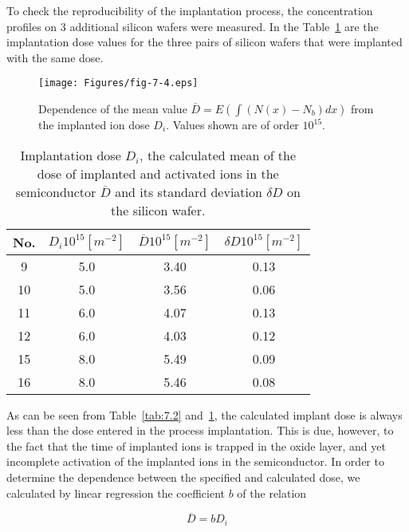 To check the reproducibility of the implantation process, the
concentration profiles on 3 additional silicon wafers were
measured. In the Table~\ref{tab:7.3} are the implantation dose values
for the three pairs of silicon wafers that were implanted with the
same dose.

\newpage
\begin{figure}[h!]\centering
  \texttt{[image: Figures/fig-7-4.eps]}
  \caption[Dependence of mean value
    $\overline{D}=E(\int(N(x)-N_{b})dx)$ on the implanted ion dose
    $D_{i}$]{Dependence of the mean value
    $\overline{D}=E(\int(N(x)-N_{b})dx)$ from the implanted ion dose
    $D_{i}$. Values shown are of order $10^{15}$.}\label{fig:7.4}
\end{figure}
 
\begin{table}[h!]\centering
  \begin{tabular}{c c c c}
    No. & $D_{i} 10^{15} [m^{-2}]$ & $\overline D 10^{15} [m^{-2}]$ & $\delta D 10^{15} [m^{-2}]$\\
    \hline
    9 & 5.0 & 3.40 & 0.13\\
    10 & 5.0 & 3.56 & 0.06\\
    11 & 6.0 & 4.07 & 0.13\\
    12 & 6.0 & 4.03 & 0.12\\
    15 & 8.0 & 5.49 & 0.09\\
    16 & 8.0 & 5.46 & 0.08\\
  \end{tabular}
  \caption[Implantation dose $D_{i}$]{Implantation dose $D_{i}$, the
    calculated mean of the dose of implanted and activated ions in the
    semiconductor $\overline D$ and its standard deviation $\delta D$
    on the silicon wafer.}\label{tab:7.3}
\end{table}

As can be seen from Table~\ref{tab:7.2} and~\ref{tab:7.3}, the
calculated implant dose is always less than the dose entered in the
process implantation. This is due, however, to the fact that the time
of implanted ions is trapped in the oxide layer, and yet incomplete
activation of the implanted ions in the semiconductor. In order to
determine the dependence between the specified and calculated dose, we
calculated by linear regression the coefficient $b$ of the relation

\begin{equation}\label{eq:7.1}
  \overline D = bD_{i}
\end{equation}

